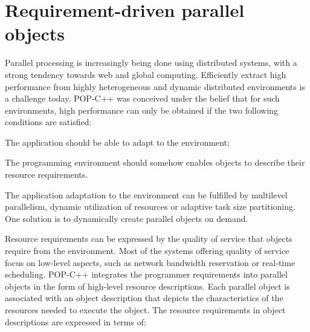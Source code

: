 

\section{Requirement-driven parallel objects}\label{sec:req:par:obj}

Parallel processing is increasingly being done using distributed
systems, with a strong tendency towards web and global computing.
Efficiently extract high performance from highly heterogeneous and
dynamic distributed environments is a challenge today. POP-C++ was
conceived under the belief that for such environments, high performance
can only be obtained if the two following conditions are satisfied:

\begin{petitem}

\item The application should be able to adapt to the environment;

\item The programming environment should somehow enables objects
to describe their resource requirements.

\end{petitem}

The application adaptation to the environment can be fulfilled by
multilevel parallelism, dynamic utilization of resources or adaptive
task size partitioning. One solution is to dynamically create parallel
objects on demand.


Resource requirements can be expressed by the quality of service that
objects require from the environment. Most of the systems offering
quality of service focus on low-level aspects, such as network bandwidth
reservation or real-time scheduling. POP-C++ integrates the programmer
requirements into parallel objects in the form of high-level resource
descriptions. Each parallel object is associated with an object
description that depicts the characteristics of the resources needed to
execute the object. The resource requirements in object descriptions are
expressed in terms of:

